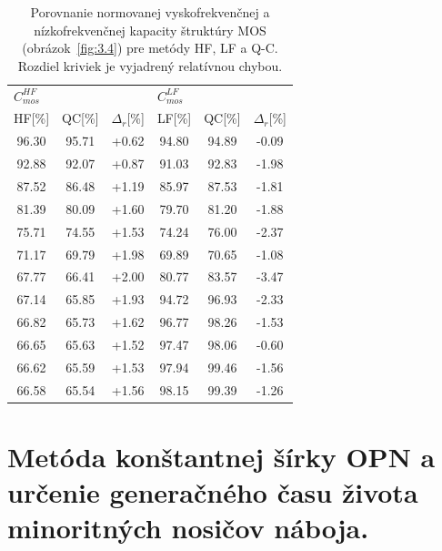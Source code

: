 \begin{table}[h!]\centering
  \begin{tabular}{c c c c c c}
  \multicolumn{3}{l}{$C^{HF}_{mos}$} & \multicolumn{3}{l}{$C^{LF}_{mos}$} \\
  HF[\%] & QC[\%] & $\Delta_r$[\%] & LF[\%] & QC[\%] & $\Delta_r$[\%] \\
  \hline
  96.30 & 95.71 & +0.62 & 94.80 & 94.89 & -0.09 \\
  92.88 & 92.07 & +0.87 & 91.03 & 92.83 & -1.98 \\
  87.52 & 86.48 & +1.19 & 85.97 & 87.53 & -1.81 \\
  81.39 & 80.09 & +1.60 & 79.70 & 81.20 & -1.88 \\
  75.71 & 74.55 & +1.53 & 74.24 & 76.00 & -2.37 \\
  71.17 & 69.79 & +1.98 & 69.89 & 70.65 & -1.08 \\
  67.77 & 66.41 & +2.00 & 80.77 & 83.57 & -3.47 \\
  67.14 & 65.85 & +1.93 & 94.72 & 96.93 & -2.33 \\
  66.82 & 65.73 & +1.62 & 96.77 & 98.26 & -1.53 \\
  66.65 & 65.63 & +1.52 & 97.47 & 98.06 & -0.60 \\
  66.62 & 65.59 & +1.53 & 97.94 & 99.46 & -1.56 \\
  66.58 & 65.54 & +1.56 & 98.15 & 99.39 & -1.26 \\
  \end{tabular}
  \caption[Porovnanie normovanej vyskofrekvenčnej a
  nízkofrekvenčnej kapacity štruktúry MOS (obrázok~\ref{fig:3.4}) pre
  metódy HF, LF a Q-C]{Porovnanie normovanej vyskofrekvenčnej a
  nízkofrekvenčnej kapacity štruktúry MOS (obrázok~\ref{fig:3.4}) pre
  metódy HF, LF a Q-C. Rozdiel kriviek je vyjadrený relatívnou
  chybou.}\label{tab:3.2}
\end{table}

\section{Metóda konštantnej šírky OPN a určenie generačného času života minoritných nosičov náboja.}\label{sec:3.4}

